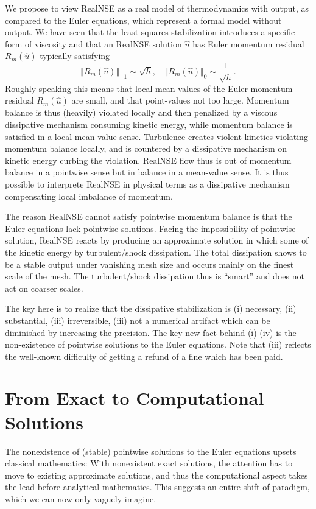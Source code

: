 We propose to view RealNSE as a real model of thermodynamics with output, 
as compared to the Euler equations, which represent a formal model 
without output. 
We have seen that the least squares stabilization introduces
a specific form of viscosity and that an RealNSE solution 
$\hat u$ has Euler momentum residual $R_m(\hat u)$ typically satisfying
\begin{equation}
\Vert R_m(\hat u)\Vert_{-1}\sim \sqrt{h},\quad \Vert R_m(\hat u)\Vert_0\sim \frac{1}{\sqrt{h}}.
\end{equation}
Roughly speaking this means that local mean-values 
of the Euler momentum residual $R_m(\hat u)$ are small, 
and that point-values not too large. Momentum balance is thus
(heavily) violated locally and then penalized by a viscous dissipative 
mechanism consuming kinetic energy, while momentum balance is satisfied 
in a local mean value
sense. Turbulence creates violent kinetics violating momentum
balance locally, and is countered by a dissipative mechanism on kinetic
energy curbing the violation. RealNSE flow thus
is out of momentum balance in a pointwise sense but in 
balance in a  mean-value sense. It is thus possible to interprete
RealNSE in physical terms as a dissipative mechanism 
compensating local imbalance of momentum.   


The reason RealNSE cannot satisfy pointwise momentum balance is that
the Euler equations lack pointwise solutions. 
Facing the impossibility
of pointwise solution, RealNSE reacts by producing an approximate
solution in which some of the kinetic energy by turbulent/shock dissipation.
The total dissipation shows to be a stable output under vanishing mesh size
and occurs mainly on the finest scale of the mesh. The turbulent/shock
dissipation thus is ``smart'' and does not act on coarser scales. 

The key here is to realize that
the dissipative stabilization is (i) necessary, (ii) substantial, 
(iii) irreversible, (iii) not
a numerical artifact which can be diminished by increasing
the precision. The key new fact behind (i)-(iv) is the 
non-existence of pointwise solutions to the Euler equations.
Note that (iii) reflects the well-known difficulty of getting
a refund of a fine which has been paid. 


\section{From Exact to Computational Solutions}

The nonexistence of (stable) pointwise solutions to the
Euler equations upsets classical mathematics: With nonexistent
exact solutions, the attention has to move to existing approximate 
solutions, and thus the computational aspect takes 
the lead before analytical mathematics. This suggests 
an entire shift of paradigm, which we can now
only vaguely imagine. 
 

